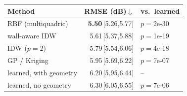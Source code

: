 \begin{tabular}{@{}lrl@{}}
\toprule
Method & RMSE (dB)$\downarrow$ & vs.\ learned \\
\midrule
RBF (multiquadric) & \textbf{5.50}\,\tiny[5.26,5.77] & $p{=}$2e-30 \\
wall-aware IDW & 5.61\,\tiny[5.37,5.88] & $p{=}$1e-19 \\
IDW ($p{=}2$) & 5.79\,\tiny[5.54,6.06] & $p{=}$4e-18 \\
GP / Kriging & 5.95\,\tiny[5.69,6.22] & $p{=}$7e-07 \\
learned, with geometry & 6.20\,\tiny[5.95,6.44] & -- \\
learned, no geometry & 6.30\,\tiny[6.05,6.55] & $p{=}$7e-06 \\
\bottomrule
\end{tabular}